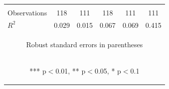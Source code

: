 \begin{center}
\begin{tabular}{lccccc}
\vspace{4pt} & \begin{footnotesize}\end{footnotesize} & \begin{footnotesize}\end{footnotesize} & \begin{footnotesize}\end{footnotesize} & \begin{footnotesize}\end{footnotesize} & \begin{footnotesize}\end{footnotesize} \\
Observations & 118 & 111 & 118 & 111 & 111 \\
 $R^2$ & 0.029 & 0.015 & 0.067 & 0.069 & 0.415 \\ \hline
\multicolumn{6}{c}{\begin{footnotesize} Robust standard errors in parentheses\end{footnotesize}} \\
\multicolumn{6}{c}{\begin{footnotesize} *** p$<$0.01, ** p$<$0.05, * p$<$0.1\end{footnotesize}} \\
\end{tabular}
\end{center}
